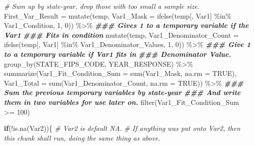 \documentclass[
]{article}
\newenvironment{Shaded}{\begin{snugshade}}{\end{snugshade}}
\newcommand{\AttributeTok}[1]{\textcolor[rgb]{0.77,0.63,0.00}{#1}}
\newcommand{\CommentTok}[1]{\textcolor[rgb]{0.56,0.35,0.01}{\textit{#1}}}
\newcommand{\ConstantTok}[1]{\textcolor[rgb]{0.00,0.00,0.00}{#1}}
\newcommand{\ControlFlowTok}[1]{\textcolor[rgb]{0.13,0.29,0.53}{\textbf{#1}}}
\newcommand{\DecValTok}[1]{\textcolor[rgb]{0.00,0.00,0.81}{#1}}
\newcommand{\DocumentationTok}[1]{\textcolor[rgb]{0.56,0.35,0.01}{\textbf{\textit{#1}}}}
\newcommand{\FunctionTok}[1]{\textcolor[rgb]{0.00,0.00,0.00}{#1}}
\newcommand{\NormalTok}[1]{#1}
\newcommand{\OtherTok}[1]{\textcolor[rgb]{0.56,0.35,0.01}{#1}}
\newcommand{\SpecialCharTok}[1]{\textcolor[rgb]{0.00,0.00,0.00}{#1}}
\begin{document}
\begin{Shaded}
\begin{Highlighting}[]
  \CommentTok{\# Sum up by state{-}year, drop those with too small a sample size.}
\NormalTok{  First\_Var\_Result }\OtherTok{=} \FunctionTok{mutate}\NormalTok{(temp, }
                            \AttributeTok{Var1\_Mask =} \FunctionTok{ifelse}\NormalTok{(temp[, Var1] }\SpecialCharTok{\%in\%}\NormalTok{ Var1\_Condition, }
                                               \DecValTok{1}\NormalTok{, }\DecValTok{0}\NormalTok{)) }\SpecialCharTok{\%\textgreater{}\%} 
    \DocumentationTok{\#\#\# Gives 1 to a temporary variable if the Var1}
    \DocumentationTok{\#\#\# Fits in condition}
    \FunctionTok{mutate}\NormalTok{(temp, }\AttributeTok{Var1\_Denominator\_Count =} 
             \FunctionTok{ifelse}\NormalTok{(temp[, Var1] }\SpecialCharTok{\%in\%}\NormalTok{ Var1\_Denominator\_Values, }\DecValTok{1}\NormalTok{, }\DecValTok{0}\NormalTok{)) }\SpecialCharTok{\%\textgreater{}\%}
    \DocumentationTok{\#\#\# Give 1 to a temporary variable if Var1 fits in}
    \DocumentationTok{\#\#\# Denominator Value.}
    \FunctionTok{group\_by}\NormalTok{(STATE\_FIPS\_CODE, YEAR\_RESPONSE) }\SpecialCharTok{\%\textgreater{}\%} 
    \FunctionTok{summarize}\NormalTok{(}\AttributeTok{Var1\_Fit\_Condition\_Sum =} \FunctionTok{sum}\NormalTok{(Var1\_Mask, }\AttributeTok{na.rm =} \ConstantTok{TRUE}\NormalTok{), }
              \AttributeTok{Var1\_Total =} \FunctionTok{sum}\NormalTok{(Var1\_Denominator\_Count, }\AttributeTok{na.rm =} \ConstantTok{TRUE}\NormalTok{)) }\SpecialCharTok{\%\textgreater{}\%}
    \DocumentationTok{\#\#\# Sum the previous temporary variables by state{-}year }
    \DocumentationTok{\#\#\# And write them in two variables for use later on.}
    \FunctionTok{filter}\NormalTok{(Var1\_Fit\_Condition\_Sum }\SpecialCharTok{\textgreater{}=} \DecValTok{100}\NormalTok{)}
  
  \ControlFlowTok{if}\NormalTok{(}\SpecialCharTok{!}\FunctionTok{is.na}\NormalTok{(Var2))\{}
    \CommentTok{\# Var2 is default NA.}
    \CommentTok{\# If anything was put onto Var2, then this chunk shall run, doing the same thing as above.}
    

\end{Highlighting}
\end{Shaded}
\end{document}

